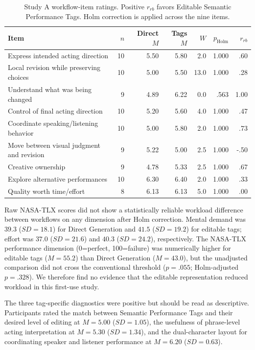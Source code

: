 \begin{table}[t]
\centering
\caption{Study A workflow-item ratings. Positive $r_{rb}$ favors Editable
Semantic Performance Tags. Holm correction is applied across the nine items.}
\label{tab:workflow_results}
\small
\begin{tabular}{lrrrrrr}
\toprule
Item & $n$ & Direct $M$ & Tags $M$ & $W$ & $p_{\mathrm{Holm}}$ & $r_{rb}$\\
\midrule
Express intended acting direction & 10 & 5.50 & 5.80 & 2.0 & 1.000 & .60\\
Local revision while preserving choices & 10 & 5.00 & 5.50 & 13.0 & 1.000 & .28\\
Understand what was being changed & 9 & 4.89 & 6.22 & 0.0 & .563 & 1.00\\
Control of final acting direction & 10 & 5.20 & 5.60 & 4.0 & 1.000 & .47\\
Coordinate speaking/listening behavior & 10 & 5.00 & 5.80 & 2.0 & 1.000 & .73\\
Move between visual judgment and revision & 9 & 5.22 & 5.00 & 2.5 & 1.000 & -.50\\
Creative ownership & 9 & 4.78 & 5.33 & 2.5 & 1.000 & .67\\
Explore alternative performances & 10 & 6.30 & 6.40 & 2.0 & 1.000 & .33\\
Quality worth time/effort & 8 & 6.13 & 6.13 & 5.0 & 1.000 & .00\\
\bottomrule
\end{tabular}
\end{table}

Raw NASA-TLX scores did not show a statistically reliable workload difference
between workflows on any dimension after Holm correction. Mental demand was
$39.3$ ($SD=18.1$) for Direct Generation and $41.5$ ($SD=19.2$) for editable
tags; effort was $37.0$ ($SD=21.6$) and $40.3$ ($SD=24.2$), respectively.
The NASA-TLX performance dimension (0=perfect, 100=failure) was numerically
higher for editable tags ($M=55.2$) than Direct Generation ($M=43.0$), but the
unadjusted comparison did not cross the conventional threshold
($p=.055$; Holm-adjusted $p=.328$). We therefore find no evidence that the
editable representation reduced workload in this first-use study.

The three tag-specific diagnostics were positive but should be read as
descriptive. Participants rated the match between Semantic Performance Tags and
their desired level of editing at $M=5.00$ ($SD=1.05$), the usefulness of
phrase-level acting interpretation at $M=5.30$ ($SD=1.34$), and the
dual-character layout for coordinating speaker and listener performance at
$M=6.20$ ($SD=0.63$).

